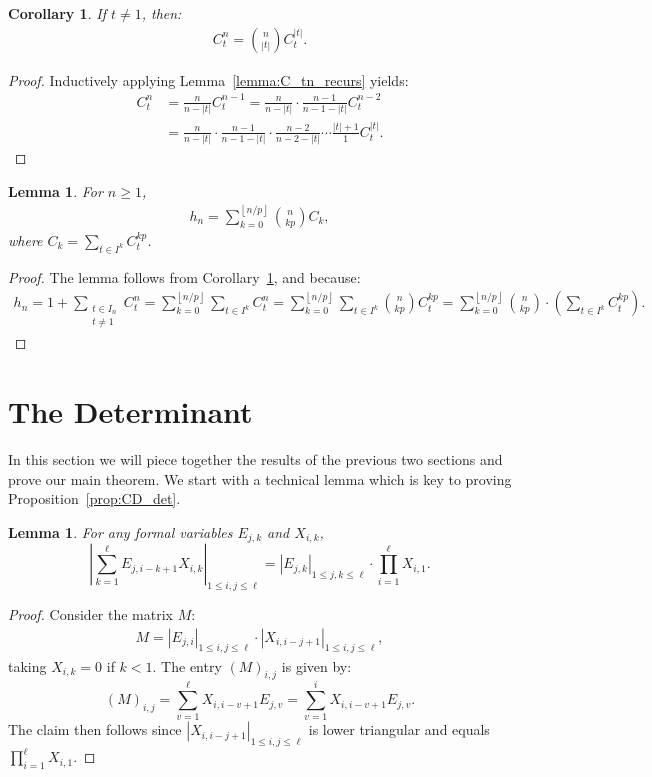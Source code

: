 \documentclass[letterpaper,oneside, 10pt]{amsart}
\newtheorem{lemma}[thm]{Lemma}
\newtheorem{corollary}[thm]{Corollary}
\theoremstyle{definition}
\numberwithin{equation}{section}
\newcommand{\floor}[1]{\left \lfloor #1 \right \rfloor}
\begin{document}
\begin{corollary}\label{cor:C_tn_binom}
If $t\neq 1$, then:
\begin{align*}
	C_t^n = \binom{n}{|t|}C_t^{|t|}.
\end{align*}
\end{corollary}
\begin{proof}
Inductively applying Lemma~\ref{lemma:C_tn_recurs} yields:
\begin{align*}
	C_t^n &= \frac{n}{n-|t|}C_t^{n-1} =  \frac{n}{n-|t|}\cdot  \frac{n-1}{n-1-|t|} C_t^{n-2}\\
		&=\frac{n}{n-|t|}\cdot  \frac{n-1}{n-1-|t|}\cdot \frac{n-2}{n-2-|t|}\cdots \frac{|t|+1}{1}C_t^{|t|}.
\end{align*}
\end{proof}

\begin{lemma}\label{lemma:h_n_expans}
For $n\geq 1$,
\begin{align*}
	h_n = \sum_{k=0}^{\floor{n/p}} \binom{n}{kp} C_k,
\end{align*}	
where $C_k = \sum_{t\in I^k}C_t^{kp}$.
\end{lemma}
\begin{proof}
The lemma follows from Corollary~\ref{cor:C_tn_binom}, and because:
\begin{align*}	
	h_n = 1+\sum_{\substack{t\in I_n\\t\neq 1}}C_t^n = \sum_{k=0}^{\floor{n/p}}\sum_{t\in I^k} C_t^n =  \sum_{k=0}^{\floor{n/p}}\sum_{t\in I^k}\binom{n}{kp}C_t^{kp} =  \sum_{k=0}^{\floor{n/p}}\binom{n}{kp}\cdot (\sum_{t\in I^k}C_t^{kp}).
\end{align*}
\end{proof}

\section{The Determinant}\label{section:ah}

In this section we will piece together the results of the previous two sections and prove our main theorem. 
We start with a technical lemma which is key to proving Proposition~\ref{prop:CD_det}.

\begin{lemma}\label{lemma:deter}
For any formal variables $E_{j,k}$ and $X_{i,k}$, 
\[
	|  \sum_{k=1}^{\ell} E_{j, i-k+1} X_{i,k} |_{1\leq i,j\leq \ell} = |E_{j,k}|_{1\leq j,k\leq \ell} \cdot \prod_{i=1}^\ell X_{i,1}.
\]
\end{lemma}
\begin{proof}
Consider the matrix $M$:
\begin{align*}
	M = |E_{j,i}|_{1\leq i,j\leq \ell}\cdot |X_{i, i-j+1}|_{1\leq i,j\leq\ell},
\end{align*}
taking $X_{i,k}=0$ if $k<1$. The entry $(M)_{i,j}$ is given by:
\[
	(M)_{i,j} = \sum_{v=1}^\ell X_{i, i-v+1}E_{j, v} = \sum_{v=1}^{i} X_{i, i-v+1}E_{j, v}.
\]
The claim then follows since $ |X_{i, i-j+1}|_{1\leq i,j\leq\ell}$ is lower triangular and equals\\ $\prod_{i=1}^\ell X_{i,1}$.
\end{proof}
\end{document}
